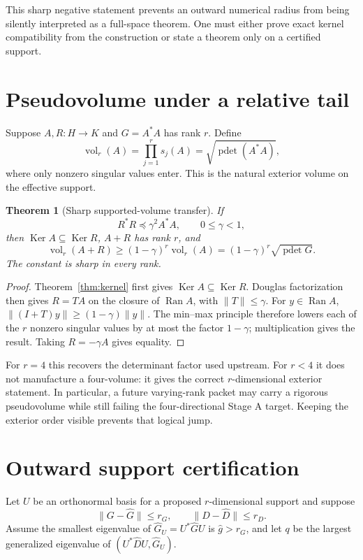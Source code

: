\documentclass[12pt]{article}
\newtheorem{theorem}{Theorem}
\newcommand{\Ker}{\operatorname{Ker}}
\newcommand{\Ran}{\operatorname{Ran}}
\newcommand{\pdet}{\operatorname{pdet}}
\begin{document}
This sharp negative statement prevents an outward numerical radius from
being silently interpreted as a full-space theorem.  One must either prove
exact kernel compatibility from the construction or state a theorem only
on a certified support.

\section{Pseudovolume under a relative tail}
Suppose $A,R:H\to K$ and $G=A^*A$ has rank $r$.  Define
\[
 \operatorname{vol}_r(A)=\prod_{j=1}^r s_j(A)
 =\sqrt{\pdet(A^*A)},
\]
where only nonzero singular values enter.  This is the natural exterior
volume on the effective support.

\begin{theorem}[Sharp supported-volume transfer]\label{thm:volume}
If
\[
 R^*R\preceq\gamma^2A^*A,
 \qquad 0\leq\gamma<1,
\]
then $\Ker A\subseteq\Ker R$, $A+R$ has rank $r$, and
\[
 \operatorname{vol}_r(A+R)
 \geq(1-\gamma)^r\operatorname{vol}_r(A)
 =(1-\gamma)^r\sqrt{\pdet G}.
\]
The constant is sharp in every rank.
\end{theorem}

\begin{proof}
Theorem~\ref{thm:kernel} first gives $\Ker A\subseteq\Ker R$.  Douglas
factorization then gives $R=TA$ on the closure of $\Ran A$, with
$\|T\|\leq\gamma$.  For $y\in\Ran A$,
$\|(I+T)y\|\geq(1-\gamma)\|y\|$.  The min--max principle therefore lowers
each of the $r$ nonzero singular values by at most the factor
$1-\gamma$; multiplication gives the result.  Taking $R=-\gamma A$ gives
equality.
\end{proof}

For $r=4$ this recovers the determinant factor used upstream.  For $r<4$
it does not manufacture a four-volume: it gives the correct $r$-dimensional
exterior statement.  In particular, a future varying-rank packet may carry
a rigorous pseudovolume while still failing the four-directional Stage A
target.  Keeping the exterior order visible prevents that logical jump.

\section{Outward support certification}
Let $U$ be an orthonormal basis for a proposed $r$-dimensional support and
suppose
\[
 \|G-\widehat G\|\leq r_G,\qquad
 \|D-\widehat D\|\leq r_D.
\]
Assume the smallest eigenvalue of
$\widehat G_U=U^*\widehat G U$ is $\widehat g>r_G$, and let $q$ be the
largest generalized eigenvalue of
$(U^*\widehat D U,\widehat G_U)$.
\end{document}
